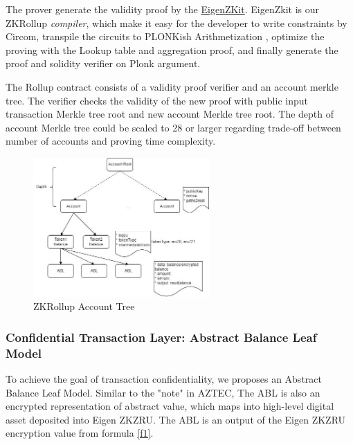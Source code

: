\documentclass{article}
\begin{document}

The prover generate the validity proof by the \href{https://github.com/0xEigenLabs/EigenZKit}{EigenZKit}. EigenZkit is our ZKRollup \textit{compiler}, which make it easy for the developer to write constraints by Circom, transpile the circuits to PLONKish Arithmetization \cite{gabizon2019plonk}, optimize the proving with the Lookup table and aggregation proof, and finally generate the proof and solidity verifier on Plonk argument. 

The Rollup contract consists of a validity proof verifier and an account merkle tree. The verifier checks the validity of the new proof with public input transaction Merkle tree root and new account Merkle tree root. The depth of account Merkle tree could be scaled to 28 or larger regarding trade-off between number of accounts and proving time complexity.  

\begin{figure}
    \centering
    \includegraphics[width=0.6\textwidth]{zkzru.drawio.png}
    \caption{\label{fig:zkzru}ZKRollup Account Tree}
\end{figure}

\subsubsection{Confidential Transaction Layer: Abstract Balance Leaf Model}
To achieve the goal of transaction confidentiality, we proposes an Abstract Balance Leaf Model. Similar to the "note" in AZTEC, The ABL is also an encrypted representation of abstract value, which maps into high-level digital asset deposited into Eigen ZKZRU. The ABL is an output of the Eigen ZKZRU encryption value from formula \ref{f1}. 
\end{document}

